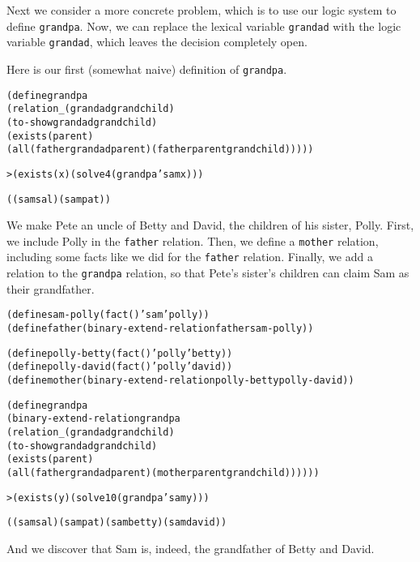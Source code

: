 Next we consider a more concrete problem, which is to use our logic
system to define \texttt{grandpa}.  Now, we can replace the lexical
variable \texttt{grandad} with the logic variable \texttt{grandad},
which leaves the decision completely open.  

Here is our first (somewhat naive) definition of \texttt{grandpa}.

\begin{alltt}
(define grandpa
  (relation _ (grandad grandchild)
    (to-show grandad grandchild)
    (exists (parent)
      (all (father grandad parent) (father parent grandchild)))))

> (exists (x) (solve 4 (grandpa 'sam x)))

((sam sal) (sam pat))
\end{alltt}

We make Pete an uncle of Betty and David, the children of his sister,
Polly.  First, we include Polly in the \texttt{father} relation.
Then, we define a \texttt{mother} relation, including some facts like
we did for the \texttt{father} relation.  Finally, we add a relation
to the \texttt{grandpa} relation, so that Pete's sister's children can
claim Sam as their grandfather.

\begin{alltt}
(define sam-polly (fact () 'sam 'polly))
(define father (binary-extend-relation father sam-polly))
\end{alltt}

\begin{alltt}
(define polly-betty (fact () 'polly 'betty))
(define polly-david (fact () 'polly 'david))
(define mother (binary-extend-relation polly-betty polly-david))
\end{alltt}

\begin{alltt}
(define grandpa
  (binary-extend-relation grandpa
    (relation _ (grandad grandchild)
      (to-show grandad grandchild)
      (exists (parent)
        (all (father grandad parent) (mother parent grandchild))))))
\end{alltt}

\begin{alltt}  
> (exists (y) (solve 10 (grandpa 'sam y)))

((sam sal) (sam pat) (sam betty) (sam david))
\end{alltt}

\noindent
And we discover that Sam is, indeed, the grandfather of
Betty and David.

